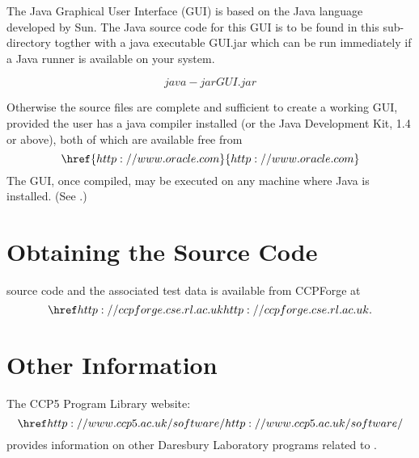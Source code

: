 The \D{} Java Graphical User Interface (GUI) is based on the Java language developed by Sun.  The Java
source code for this GUI is to be found in this sub-directory togther
with a java executable GUI.jar which can be run immediately if a Java
runner is available on your system.

\[java -jar GUI.jar \]

Otherwise the source files are complete and sufficient to create a
working GUI, provided the user has a java compiler installed (or the
Java Development Kit, 1.4 or above), both of which are available free
from \[\href{http://www.oracle.com}{http://www.oracle.com}\] 
The GUI, once compiled, may be executed on any machine where Java is installed.
(See \cite{smith-gui}.)

\section{Obtaining the Source Code}

 \D{} source code and the associated test data is available from
CCPForge at \[ \FORGE. \]


\section{Other Information}

The CCP5 Program Library website: \[\SOFT{} \index{WWW}\] provides
information on other Daresbury Laboratory programs related to \DD{}.

\clearpage
